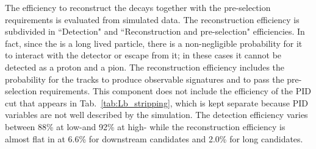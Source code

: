 The efficiency to reconstruct the decays together with the pre-selection requirements is
evaluated from simulated data. 
The reconstruction efficiency is subdivided in ``Detection" and ``Reconstruction and pre-selection" efficiencies.
In fact, since the \Lz is a long lived particle, there is a non-negligible probability for it to interact with the detector
or escape from it; in these cases it cannot be detected as a proton and a pion. 
The reconstruction efficiency includes the probability 
for the tracks to produce observable signatures and to pass the pre-selection 
requirements. This component does not include the efficiency
of the PID cut that appears in Tab.~\ref{tab:Lb_stripping}, which is kept separate
because PID variables are not well described by the simulation.
The detection efficiency varies between 88\% at low-\qsq and 92\% at high-\qsq
while the reconstruction efficiency is almost flat in \qsq at 6.6\% for downstream candidates
and 2.0\% for long candidates.
%
%
